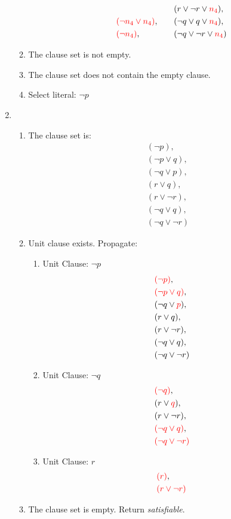 \documentclass[11pt,a4paper]{article}
\begin{document}
\begin{enumerate}
\begin{enumerate}
\begin{enumerate}
\begin{align*}
& & &  & & (r \lor \neg r \lor \textcolor{red}{n_4}), \\
&\textcolor{red}{(\neg n_4 \lor  n_4 )} , & & & & (\neg q \lor q \lor \textcolor{red}{n_4}), \\
&\textcolor{red}{(\neg n_4 )}, &&  & & (\neg q \lor \neg r \lor \textcolor{red}{ n_4})
\end{align*}
\end{enumerate}
\item The clause set is not empty.
\item The clause set does not contain the empty clause.
\item Select literal: $\neg p$
\end{enumerate}



\item 
\begin{enumerate}
\item The clause set is:
\begin{align*}
&( \neg p ), \\ 
&( \neg p \lor q), \\ 
&(\neg q \lor p), \\
&(r \lor q), \\
&(r \lor \neg r ), \\
&(\neg q \lor q ), \\
&(\neg q \lor \neg r)
\end{align*}
\item Unit clause exists. Propagate:
\begin{enumerate}
\item Unit Clause:  $\neg p$
\begin{align*}
&\textcolor{red}{( \neg p )}, \\ 
&\textcolor{red}{( \neg p \lor q)}, \\ 
&(\neg q \lor \textcolor{red}{p}), \\
&(r \lor q), \\
&(r \lor \neg r ), \\
&(\neg q \lor q ), \\
&(\neg q \lor \neg r)
\end{align*}
\item Unit Clause:  $\neg q$
\begin{align*}
&\textcolor{red}{(\neg q )}, \\
&(r \lor \textcolor{red}{q}), \\
&(r \lor \neg r ), \\
&\textcolor{red}{(\neg q \lor q )}, \\
&\textcolor{red}{(\neg q \lor \neg r)}
\end{align*}
\item Unit Clause:  $r$
\begin{align*}
&\textcolor{red}{(r )}, \\
&\textcolor{red}{(r \lor \neg r )} \\
\end{align*}
\end{enumerate}
\item The clause set is empty. Return \emph{satisfiable}.
\end{enumerate}


\end{enumerate}
\end{document}
